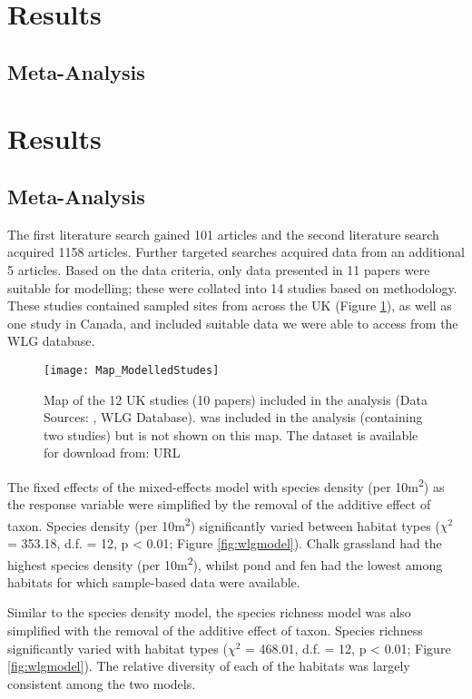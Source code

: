 \ifappendixStyle %
\section{Results}
\subsection{Meta-Analysis}%
\else
\section*{Results}
\subsection*{Meta-Analysis}
\fi

The first literature search gained 101 articles and the second literature search acquired 1158 articles. Further targeted searches acquired data from an additional 5 articles. Based on the data criteria, only data presented in 11 papers were suitable for modelling; these were collated into 14 studies based on methodology. These studies contained sampled sites from across the UK (Figure \ref{fig:wlgmap}), as well as one study in Canada, and included suitable data we were able to access from the WLG database.

\begin{figure}[t]
	\centering
	\texttt{[image: Map\_ModelledStudes]}
	\caption{Map of the 12 UK studies (10 papers) included in the analysis (Data Sources: \cite{Petit:1998bc,Wilson:2003aee,Fountain:2004et,Smith:2006ue,Butt:2008ejsb,Williams:2008hb,Scriven:2013ije,Sirohi:2015jic,Speak:2015ufug}, WLG Database). \cite{Macivor:2011ue} was included in the analysis (containing two studies) but is not shown on this map. The dataset is available for download from: URL}
   	 \label{fig:wlgmap}
\end{figure}

The fixed effects of the mixed-effects model with species density (per 10m\textsuperscript{2}) as the response variable were simplified by the removal of the additive effect of taxon. Species density (per 10m\textsuperscript{2}) significantly varied between habitat types ($\chi^2$ = 353.18, d.f. = 12, p < 0.01; Figure \ref{fig:wlgmodel}). Chalk grassland had the highest species density (per 10m\textsuperscript{2}), whilst pond and fen had the lowest among habitats for which sample-based data were available. 

Similar to the species density model, the species richness model was also simplified with the removal of the additive effect of taxon. Species richness significantly varied with habitat types ($\chi^2$ = 468.01, d.f. = 12, p < 0.01; Figure \ref{fig:wlgmodel}). The relative diversity of each of the habitats was largely consistent among the two models.
 	 
